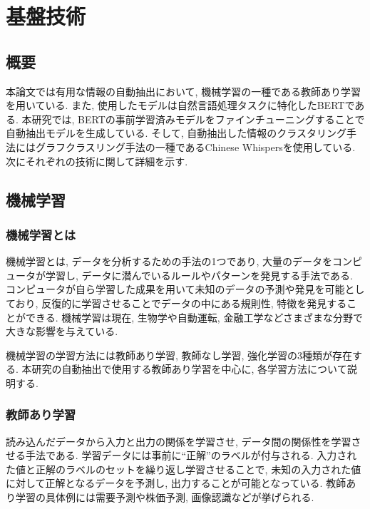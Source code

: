 \chapter{基盤技術}
\label{chap:kibangijyutu}



\section{概要}
本論文では有用な情報の自動抽出において, 機械学習の一種である教師あり学習を用いている. 
また, 使用したモデルは自然言語処理タスクに特化したBERTである. 本研究では, BERTの事前学習済みモデルをファインチューニングすることで自動抽出モデルを生成している. 
そして, 自動抽出した情報のクラスタリング手法にはグラフクラスリング手法の一種であるChinese Whispersを使用している. 
次にそれぞれの技術に関して詳細を示す. 


\section{機械学習}
\subsection{機械学習とは}
機械学習とは, データを分析するための手法の1つであり, 大量のデータをコンピュータが学習し, データに潜んでいるルールやパターンを発見する手法である. コンピュータが自ら学習した成果を用いて未知のデータの予測や発見を可能としており, 反復的に学習させることでデータの中にある規則性, 特徴を発見することができる. 機械学習は現在, 生物学や自動運転, 金融工学などさまざまな分野で大きな影響を与えている. 

機械学習の学習方法には教師あり学習, 教師なし学習, 強化学習の3種類が存在する. 本研究の自動抽出で使用する教師あり学習を中心に, 各学習方法について説明する. 

\subsection{教師あり学習}
読み込んだデータから入力と出力の関係を学習させ, データ間の関係性を学習させる手法である. 学習データには事前に``正解''のラベルが付与される. 
入力された値と正解のラベルのセットを繰り返し学習させることで, 未知の入力された値に対して正解となるデータを予測し, 出力することが可能となっている. 
教師あり学習の具体例には需要予測や株価予測, 画像認識などが挙げられる. 

